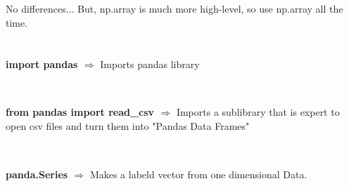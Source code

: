 \documentclass[a4paper,18pt]{article}
\begin{document}
\subsection{\colorbox {matgreen}{\color{white}{\large np.ndarray VS np.array}}}
No differences... But, np.array is much more high-level, so use np.array all the time.


\newpage

\section{\colorbox {Abi}{}}
\subsection{\colorbox {matgreen}{\color{white}{\large import pandas}}}
\textbf{import pandas $\Rightarrow$} Imports pandas library\\\\


\subsection{\colorbox {matgreen}{\color{white}{\large from pandas import read\_csv}}}
\textbf{from pandas import read\_csv $\Rightarrow$} Imports a sublibrary that is expert to open csv files and turn them into "Pandas Data Frames"\\\\


\subsection{\colorbox {matgreen}{\color{white}{\large pandas.Series(data=Data, index=labels)}}}
\textbf{panda.Series $\Rightarrow$} Makes a labeld vector from one dimensional Data.\\\\
\end{document}
